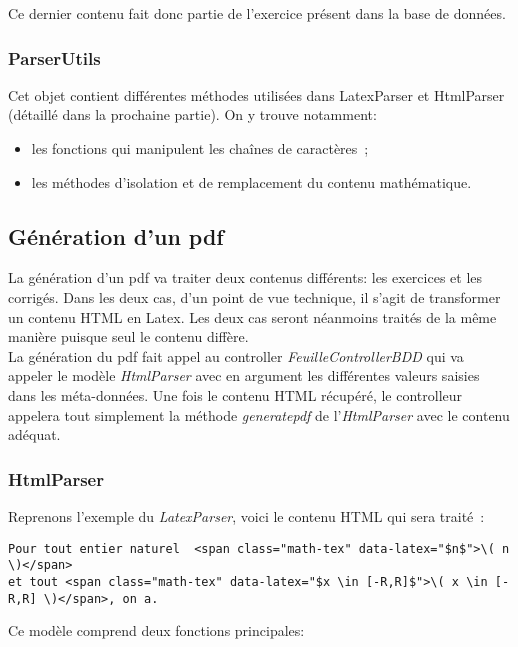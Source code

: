 Ce dernier contenu fait donc partie de l'exercice présent dans la base de données.

\subsubsection{ParserUtils}
Cet objet contient différentes méthodes utilisées dans LatexParser et HtmlParser (détaillé dans la prochaine partie). On y trouve notamment:
\smallskip
\begin{itemize}
\item les fonctions qui manipulent les chaînes de caractères~;
\item les méthodes d'isolation et de remplacement du contenu mathématique.
\end{itemize}

\subsection{Génération d'un pdf}

La génération d'un pdf va traiter deux contenus différents: les exercices et les corrigés. Dans les deux cas, d'un point de vue technique, il s'agit de transformer un contenu HTML en Latex. Les deux cas seront néanmoins traités de la même manière puisque seul le contenu diffère.\\
La génération du pdf fait appel au controller \textit{FeuilleControllerBDD} qui va appeler le modèle \textit{HtmlParser} avec en argument les différentes valeurs saisies dans les méta-données. Une fois le contenu HTML récupéré, le controlleur appelera tout simplement la méthode \textit{generatepdf} de l'\textit{HtmlParser} avec le contenu adéquat.

\subsubsection{HtmlParser}

Reprenons l'exemple du \textit{LatexParser}, voici le contenu HTML qui sera traité~:

\begin{Verbatim}[frame=single,fontsize=\scriptsize]
Pour tout entier naturel  <span class="math-tex" data-latex="$n$">\( n \)</span>
et tout <span class="math-tex" data-latex="$x \in [-R,R]$">\( x \in [-R,R] \)</span>, on a.
\end{Verbatim}

Ce modèle comprend deux fonctions principales:
\smallskip


